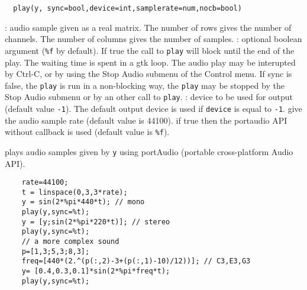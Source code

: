 
\begin{mandesc}
\end{mandesc}
\begin{calling_sequence}
\begin{verbatim}
  play(y, sync=bool,device=int,samplerate=num,nocb=bool)  
\end{verbatim}
\end{calling_sequence}
\begin{parameters}
  \begin{varlist}
    : audio sample given as a real matrix. The number of 
    rows gives the number of channels. The number of columns gives 
    the number of samples.
    : optional boolean argument (\verb+%f+ by default). If true the call to \verb+play+ 
    will block until the end of the play. The waiting time is spent
    in a gtk loop. The audio play may be interupted by 
    Ctrl-C, or by using the Stop Audio submenu of the Control menu. 
    If sync is false, the \verb+play+ is run in a non-blocking way, the 
    \verb+play+ may be stopped by the  Stop Audio submenu or by an other call 
    to \verb+play+. 
   : device to be used for output (default value \verb+-1+). The default output 
   device is used if \verb+device+ is equal to \verb+-1+.
    give the audio sample rate (default value is 44100).
    if true then the portaudio API without callback is used 
   (default value is \verb+%f+).
  \end{varlist}
\end{parameters}

\begin{mandescription}
  plays audio samples given by \verb+y+ using portAudio (portable cross-platform Audio API).
\end{mandescription}
\begin{examples}
  \begin{Verbatim}
    rate=44100;
    t = linspace(0,3,3*rate);
    y = sin(2*%pi*440*t); // mono 
    play(y,sync=%t);
    y = [y;sin(2*%pi*220*t)]; // stereo
    play(y,sync=%t);
    // a more complex sound 
    p=[1,3;5,3;8,3]; 
    freq=[440*(2.^(p(:,2)-3+(p(:,1)-10)/12))]; // C3,E3,G3
    y= [0.4,0.3,0.1]*sin(2*%pi*freq*t);
    play(y,sync=%t);
  \end{Verbatim}
\end{examples}
\begin{manseealso}
\end{manseealso}


